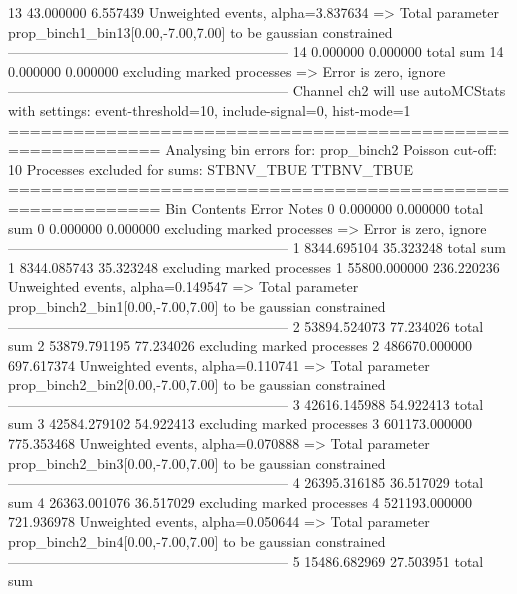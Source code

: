 13         43.000000       6.557439        Unweighted events, alpha=3.837634
  => Total parameter prop_binch1_bin13[0.00,-7.00,7.00] to be gaussian constrained
------------------------------------------------------------
14         0.000000        0.000000        total sum                     
14         0.000000        0.000000        excluding marked processes    
  => Error is zero, ignore      
------------------------------------------------------------
Channel ch2 will use autoMCStats with settings: event-threshold=10, include-signal=0, hist-mode=1
============================================================
Analysing bin errors for: prop_binch2
Poisson cut-off: 10
Processes excluded for sums: STBNV_TBUE TTBNV_TBUE
============================================================
Bin        Contents        Error           Notes                         
0          0.000000        0.000000        total sum                     
0          0.000000        0.000000        excluding marked processes    
  => Error is zero, ignore      
------------------------------------------------------------
1          8344.695104     35.323248       total sum                     
1          8344.085743     35.323248       excluding marked processes    
1          55800.000000    236.220236      Unweighted events, alpha=0.149547
  => Total parameter prop_binch2_bin1[0.00,-7.00,7.00] to be gaussian constrained
------------------------------------------------------------
2          53894.524073    77.234026       total sum                     
2          53879.791195    77.234026       excluding marked processes    
2          486670.000000   697.617374      Unweighted events, alpha=0.110741
  => Total parameter prop_binch2_bin2[0.00,-7.00,7.00] to be gaussian constrained
------------------------------------------------------------
3          42616.145988    54.922413       total sum                     
3          42584.279102    54.922413       excluding marked processes    
3          601173.000000   775.353468      Unweighted events, alpha=0.070888
  => Total parameter prop_binch2_bin3[0.00,-7.00,7.00] to be gaussian constrained
------------------------------------------------------------
4          26395.316185    36.517029       total sum                     
4          26363.001076    36.517029       excluding marked processes    
4          521193.000000   721.936978      Unweighted events, alpha=0.050644
  => Total parameter prop_binch2_bin4[0.00,-7.00,7.00] to be gaussian constrained
------------------------------------------------------------
5          15486.682969    27.503951       total sum                     
